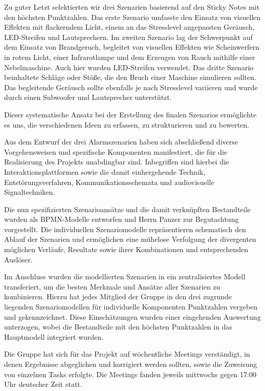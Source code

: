 Zu guter Letzt selektierten wir drei Szenarien basierend auf den \glqq Sticky Notes\grqq{} mit den höchsten Punktzahlen. Das erste Szenario umfasste den Einsatz von visuellen Effekten mit flackerndem Licht, einem an das Stresslevel angepassten Geräusch, LED-Streifen und Lautsprechern. Im zweiten Szenario lag der Schwerpunkt auf dem Einsatz von Brandgeruch, begleitet von visuellen Effekten wie Scheinwerfern in rotem Licht, einer Infrarotlampe und dem Erzeugen von Rauch mithilfe einer Nebelmaschine. Auch hier wurden LED-Streifen verwendet. Das dritte Szenario beinhaltete Schläge oder Stöße, die den Bruch einer Maschine simulieren sollten. Das begleitende Geräusch sollte ebenfalls je nach Stresslevel variieren und wurde durch einen Subwoofer und Lautsprecher unterstützt.

Dieser systematische Ansatz bei der Erstellung des finalen Szenarios ermöglichte es uns, die verschiedenen Ideen zu erfassen, zu strukturieren und zu bewerten.

Aus dem Entwurf der drei Alarmszenarien haben sich abschließend diverse Vorgehensweisen und spezifische Komponenten manifestiert, die für die Realisierung des Projekts unabdingbar sind. Inbegriffen sind hierbei die Interaktionsplattformen sowie die damit einhergehende Technik, Entstörungsverfahren, Kommunikationsschemata und audiovisuelle Signaltechniken.

Die nun spezifizierten Szenarioansätze und die damit verknüpften Bestandteile wurden als BPMN-Modelle entworfen und Herrn Panzer zur Begutachtung vorgestellt. Die individuellen Szenariomodelle repräsentieren schematisch den Ablauf der Szenarien und ermöglichen eine mühelose Verfolgung der divergenten möglichen Verläufe, Resultate sowie ihrer Kombinationen und entsprechenden Auslöser.

Im Anschluss wurden die modellierten Szenarien in ein zentralisiertes Modell transferiert, um die besten Merkmale und Ansätze aller Szenarien zu kombinieren. Hierzu hat jedes Mitglied der Gruppe in den drei zugrunde liegenden Szenariomodellen für individuelle Komponenten Punktzahlen vergeben und gekennzeichnet. Diese Einschätzungen wurden einer eingehenden Auswertung unterzogen, wobei die Bestandteile mit den höchsten Punktzahlen in das Hauptmodell integriert wurden.

Die Gruppe hat sich für das Projekt auf wöchentliche Meetings verständigt, in denen Ergebnisse abgeglichen und korrigiert werden sollten, sowie die Zuweisung von einzelnen Tasks erfolgte. Die Meetings fanden jeweils mittwochs gegen 17:00 Uhr deutscher Zeit statt.
\\
\label{section:name-}